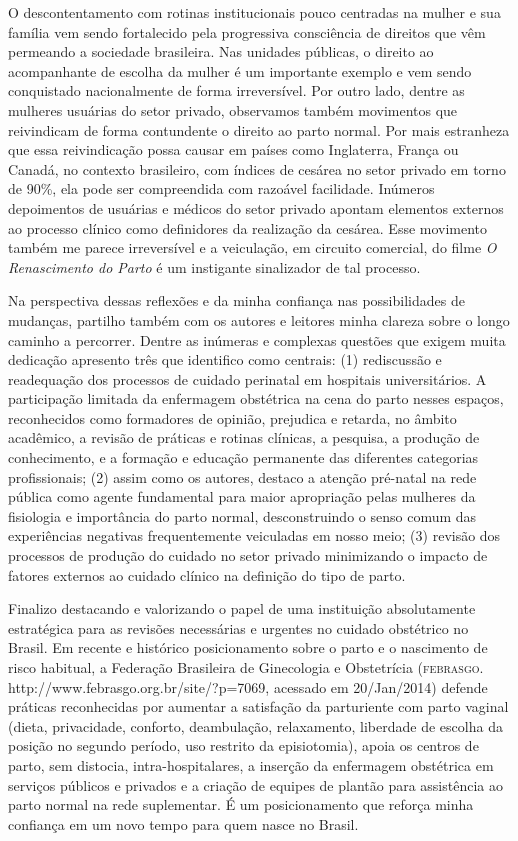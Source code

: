 \documentclass{article}
\begin{document}
O descontentamento com rotinas institucionais pouco centradas na mulher e sua
família vem
sendo fortalecido pela progressiva consciência de direitos que vêm permeando a
sociedade
brasileira. Nas unidades públicas, o direito ao acompanhante de escolha da
mulher é um
importante exemplo e vem sendo conquistado nacionalmente de forma irreversível.
Por outro
lado, dentre as mulheres usuárias do setor privado, observamos também movimentos
que
reivindicam de forma contundente o direito ao parto normal. Por mais estranheza
que essa
reivindicação possa causar em países como Inglaterra, França ou Canadá, no
contexto
brasileiro, com índices de cesárea no setor privado em torno de 90\%, ela pode
ser compreendida
com razoável facilidade. Inúmeros depoimentos de usuárias e médicos do setor
privado apontam
elementos externos ao processo clínico como definidores da realização da
cesárea. Esse
movimento também me parece irreversível e a veiculação, em circuito comercial,
do filme
\textit{O Renascimento do Parto}
é um instigante sinalizador de tal processo.

Na perspectiva dessas reflexões e da minha confiança nas possibilidades de
mudanças, partilho
também com os autores e leitores minha clareza sobre o longo caminho a
percorrer. Dentre as
inúmeras e complexas questões que exigem muita dedicação apresento três que
identifico como
centrais: (1) rediscussão e readequação dos processos de cuidado perinatal em
hospitais
universitários. A participação limitada da enfermagem obstétrica na cena do
parto nesses
espaços, reconhecidos como formadores de opinião, prejudica e retarda, no âmbito
acadêmico, a
revisão de práticas e rotinas clínicas, a pesquisa, a produção de conhecimento,
e a formação e
educação permanente das diferentes categorias profissionais; (2) assim como os
autores,
destaco a atenção pré-natal na rede pública como agente fundamental para maior
apropriação
pelas mulheres da fisiologia e importância do parto normal, desconstruindo o
senso comum das
experiências negativas frequentemente veiculadas em nosso meio; (3) revisão dos
processos de
produção do cuidado no setor privado minimizando o impacto de fatores externos
ao cuidado
clínico na definição do tipo de parto.

Finalizo destacando e valorizando o papel de uma instituição absolutamente
estratégica para
as revisões necessárias e urgentes no cuidado obstétrico no Brasil. Em recente e
histórico
posicionamento sobre o parto e o nascimento de risco habitual, a Federação
Brasileira de
Ginecologia e Obstetrícia (\textsc{febrasgo}. http://www.febrasgo.org.br/site/?p=7069,
acessado em
20/Jan/2014) defende práticas reconhecidas por aumentar a satisfação da
parturiente com parto
vaginal (dieta, privacidade, conforto, deambulação, relaxamento, liberdade de
escolha da
posição no segundo período, uso restrito da episiotomia), apoia os centros de
parto, sem
distocia, intra-hospitalares, a inserção da enfermagem obstétrica em serviços
públicos e
privados e a criação de equipes de plantão para assistência ao parto normal na
rede
suplementar. É um posicionamento que reforça minha confiança em um novo tempo
para quem nasce
no Brasil.
\end{document}
